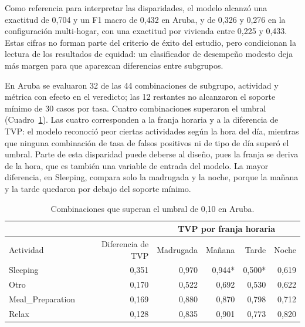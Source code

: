 Como referencia para interpretar las disparidades, el modelo alcanzó una
exactitud de 0,704 y un F1 macro de 0,432 en Aruba, y de 0,326 y 0,276 en la
configuración multi-hogar, con una exactitud por vivienda entre 0,225 y 0,433.
Estas cifras no forman parte del criterio de éxito del estudio, pero condicionan
la lectura de los resultados de equidad: un clasificador de desempeño modesto
deja más margen para que aparezcan diferencias entre subgrupos.

En Aruba se evaluaron 32 de las 44 combinaciones de subgrupo, actividad y
métrica con efecto en el veredicto; las 12 restantes no alcanzaron el soporte
mínimo de 30 casos por tasa. Cuatro combinaciones superaron el umbral
(Cuadro~\ref{cuadro:aruba}). Las cuatro corresponden a la franja horaria y a la
diferencia de TVP: el modelo reconoció peor ciertas actividades según la hora
del día, mientras que ninguna combinación de tasa de falsos positivos ni de tipo
de día superó el umbral. Parte de esta disparidad puede deberse al diseño, pues
la franja se deriva de la hora, que es también una variable de entrada del
modelo. La mayor diferencia, en Sleeping, compara solo la madrugada y la noche,
porque la mañana y la tarde quedaron por debajo del soporte mínimo.

\begin{table}[htbp]
  \caption{Combinaciones que superan el umbral de 0,10 en Aruba.}
  \label{cuadro:aruba}
  \small
  \begin{tabularx}{\linewidth}{@{}>{\raggedright\arraybackslash}X*{5}{r}@{}}
    \toprule
    & & \multicolumn{4}{c}{TVP por franja horaria} \\
    \cmidrule(l){3-6}
    Actividad & Diferencia de TVP & Madrugada & Mañana & Tarde & Noche \\
    \midrule
    Sleeping         & 0,351 & 0,970 & 0,944* & 0,500* & 0,619 \\
    Otro             & 0,170 & 0,522 & 0,692  & 0,530  & 0,622 \\
    Meal\_Preparation & 0,169 & 0,880 & 0,870  & 0,798  & 0,712 \\
    Relax            & 0,128 & 0,835 & 0,901  & 0,773  & 0,820 \\
    \bottomrule
  \end{tabularx}
  \par{}
\end{table}

